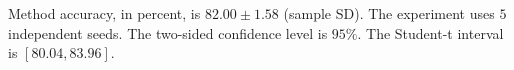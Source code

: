 \documentclass{article}
\begin{document}
Method accuracy, in percent, is $82.00 \pm 1.58$ (sample SD).
The experiment uses $5$ independent seeds.
The two-sided confidence level is $95\%$.
The Student-t interval is $[80.04, 83.96]$.
\end{document}
